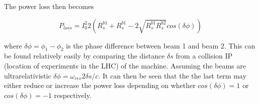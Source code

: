 The power loss then becomes

\begin{equation}
P_{loss} = I_{0}^{2} 2 \left( R_{s}^{b1} +  R_{s}^{b1} - 2\sqrt{R^{b1}_{s}R^{b2}_{s}} cos \left( \delta \phi \right) \right)
\end{equation}

where $\delta \phi = \phi_{1} - \phi_{2}$ is the phase difference between beam 1 and beam 2. This can be found relatively easily by comparing the distance $\delta s$ from a collision IP (location of experiments in the LHC) of the machine. Assuming the beams are ultrarelativistic $\delta \phi = \omega_{rev} 2  \delta s /c$. It can then be seen that the the last term may either reduce or increase the power loss depending on whether $cos\left( \delta \phi \right) = 1$ or $cos\left( \delta \phi \right) = -1$ respectively.

